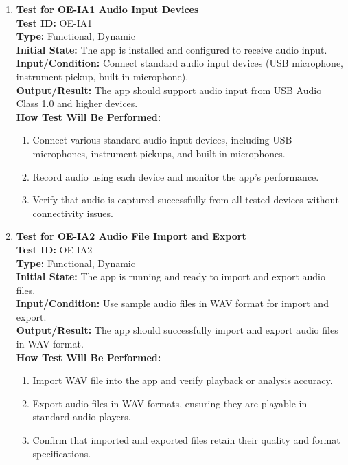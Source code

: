 \documentclass[12pt, titlepage]{article}
\begin{document}
\begin{enumerate}
    \item \textbf{Test for OE-IA1 Audio Input Devices} \\
      \newline
      \textbf{Test ID:} OE-IA1 \\
      \textbf{Type:} Functional, Dynamic \\
      \textbf{Initial State:} The app is installed and configured to receive audio input. \\
      \textbf{Input/Condition:} Connect standard audio input devices (USB microphone, instrument pickup, built-in microphone). \\
      \textbf{Output/Result:} The app should support audio input from USB Audio Class 1.0 and higher devices. \\
      \textbf{How Test Will Be Performed:}
      \begin{enumerate}
          \item Connect various standard audio input devices, including USB microphones, instrument pickups, and built-in microphones.
          \item Record audio using each device and monitor the app’s performance.
          \item Verify that audio is captured successfully from all tested devices without connectivity issues.
      \end{enumerate}

    \item \textbf{Test for OE-IA2 Audio File Import and Export} \\
      \newline
      \textbf{Test ID:} OE-IA2 \\
      \textbf{Type:} Functional, Dynamic \\
      \textbf{Initial State:} The app is running and ready to import and export audio files. \\
      \textbf{Input/Condition:} Use sample audio files in WAV format for import and export. \\
      \textbf{Output/Result:} The app should successfully import and export audio files in WAV format. \\
      \textbf{How Test Will Be Performed:}
      \begin{enumerate}
          \item Import WAV file into the app and verify playback or analysis accuracy.
          \item Export audio files in WAV formats, ensuring they are playable in standard audio players.
          \item Confirm that imported and exported files retain their quality and format specifications.
      \end{enumerate}


\end{enumerate}
\end{document}
